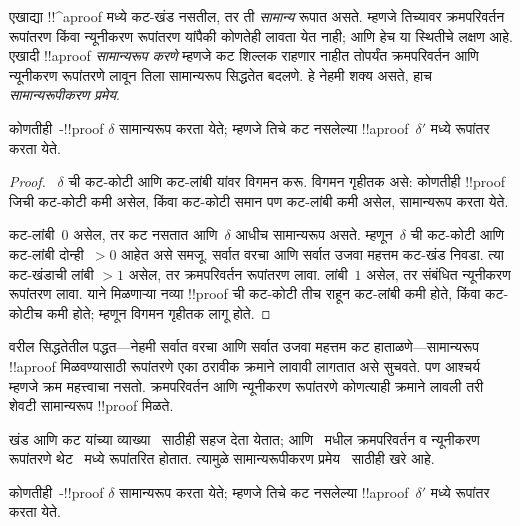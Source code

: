 \documentclass[../../../include/open-logic-section]{subfiles}
\begin{document}


एखाद्या !!^a{proof} मध्ये
कट-खंड नसतील, तर ती
\emph{सामान्य} रूपात असते.
म्हणजे तिच्यावर क्रमपरिवर्तन
रूपांतरण किंवा न्यूनीकरण
रूपांतरण यांपैकी कोणतेही
लावता येत नाही; आणि
हेच या स्थितीचे लक्षण आहे.
एखादी !!a{proof}
\emph{सामान्यरूप करणे}
म्हणजे कट शिल्लक
राहणार नाहीत तोपर्यंत
क्रमपरिवर्तन आणि न्यूनीकरण
रूपांतरणे लावून तिला
सामान्यरूप सिद्धतेत
बदलणे. हे नेहमी शक्य
असते, हाच
\emph{सामान्यरूपीकरण प्रमेय}.

\begin{thm}
कोणतीही~-!!{proof}
$\delta$ सामान्यरूप करता
येते; म्हणजे तिचे कट
नसलेल्या !!a{proof}~$\delta'$
मध्ये रूपांतर करता येते.
\end{thm}

\begin{proof}
  ~$\delta$ ची कट-कोटी
  आणि कट-लांबी यांवर
  विगमन करू. विगमन
  गृहीतक असे: कोणतीही
  !!{proof} जिची
  कट-कोटी कमी असेल,
  किंवा कट-कोटी समान
  पण कट-लांबी कमी असेल,
  सामान्यरूप करता येते.

  कट-लांबी~$0$
  असेल, तर कट नसतात
  आणि~$\delta$ आधीच
  सामान्यरूप असते.
  म्हणून~$\delta$ ची
  कट-कोटी आणि कट-लांबी
  दोन्ही~$>0$ आहेत असे
  समजू. सर्वात वरचा
  आणि सर्वात उजवा
  महत्तम कट-खंड निवडा.
  त्या कट-खंडाची लांबी
  $>1$ असेल, तर
  क्रमपरिवर्तन रूपांतरण
  लावा. लांबी~$1$
  असेल, तर संबंधित
  न्यूनीकरण रूपांतरण लावा.
  याने मिळणाऱ्या नव्या
  !!{proof} ची कट-कोटी
  तीच राहून कट-लांबी
  कमी होते, किंवा
  कट-कोटीच कमी होते;
  म्हणून विगमन गृहीतक
  लागू होते.
\end{proof}

वरील सिद्धतेतील
पद्धत—नेहमी सर्वात
वरचा आणि सर्वात
उजवा महत्तम कट
हाताळणे—सामान्यरूप
!!a{proof} मिळवण्यासाठी
रूपांतरणे एका ठरावीक
क्रमाने लावावी लागतात
असे सुचवते. पण आश्चर्य
म्हणजे क्रम महत्त्वाचा
नसतो. क्रमपरिवर्तन आणि
न्यूनीकरण रूपांतरणे
कोणत्याही क्रमाने
लावली तरी शेवटी
सामान्यरूप !!{proof}
मिळते.

खंड आणि कट यांच्या
व्याख्या~
साठीही सहज देता येतात;
आणि~ मधील
क्रमपरिवर्तन व न्यूनीकरण
रूपांतरणे थेट~
मध्ये रूपांतरित होतात.
त्यामुळे सामान्यरूपीकरण
प्रमेय~ साठीही
खरे आहे.

\begin{thm}
कोणतीही~-!!{proof}
$\delta$ सामान्यरूप करता
येते; म्हणजे तिचे कट
नसलेल्या !!a{proof}~$\delta'$
मध्ये रूपांतर करता येते.
\end{thm}
\end{document}
